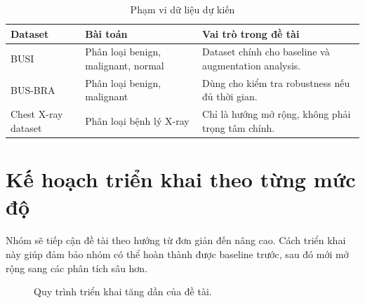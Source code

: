 \documentclass[12pt,a4paper]{article}
\begin{document}
\begin{table}[H]
\centering
\caption{Phạm vi dữ liệu dự kiến}
\renewcommand{\arraystretch}{1.2}
\begin{tabular}{p{4cm} p{5.5cm} p{6.1cm}}
\toprule
\textbf{Dataset} & \textbf{Bài toán} & \textbf{Vai trò trong đề tài} \\
\midrule
BUSI & Phân loại benign, malignant, normal & Dataset chính cho baseline và augmentation analysis. \\
BUS-BRA & Phân loại benign, malignant & Dùng cho kiểm tra robustness nếu đủ thời gian. \\
Chest X-ray dataset & Phân loại bệnh lý X-ray & Chỉ là hướng mở rộng, không phải trọng tâm chính. \\
\bottomrule
\end{tabular}
\end{table}

\section{Kế hoạch triển khai theo từng mức độ}

Nhóm sẽ tiếp cận đề tài theo hướng từ đơn giản đến nâng cao. Cách triển khai này giúp đảm bảo nhóm có thể hoàn thành được baseline trước, sau đó mới mở rộng sang các phân tích sâu hơn.

\begin{figure}[H]
\centering
{}
\caption{Quy trình triển khai tăng dần của đề tài.}
\end{figure}
\end{document}

